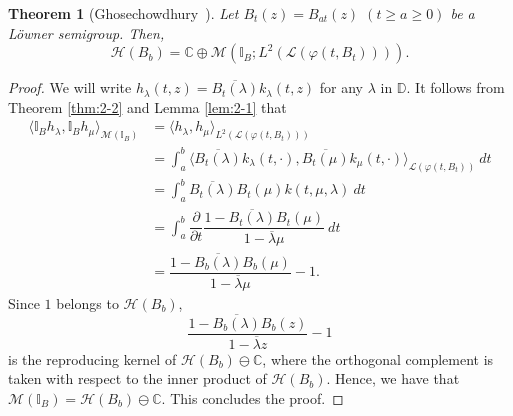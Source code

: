 \documentclass[12pt]{article}
\newtheorem{thm}{Theorem}[section]
\numberwithin{equation}{section}
\newcommand{\M}{{\mathcal M}}
\newcommand{\cL}{{\mathcal L}}
\newcommand{\C}{{\mathbb C}}
\newcommand{\D}{{\mathbb D}}
\newcommand{\bI}{{\mathbb I}}
\newcommand{\cH}{{\mathcal H}}
\newcommand{\la}{\langle}
\newcommand{\ra}{\rangle}
\newcommand{\p}{\partial}
\newcommand{\lam}{\lambda}
\begin{document}
\begin{thm}[Ghosechowdhury~\cite{G2}]\label{thm:5-2}
Let $B_t(z)=B_{at}(z)$ $(t\geq a\geq 0)$ be a L\"{o}wner semigroup. Then, 
\[
\cH(B_b)=\C \oplus \M(\bI_B; L^2(\cL(\varphi(t,B_t)))).
\]
\end{thm}

\begin{proof}
We will write $h_{\lam}(t,z)=\overline{B_t(\lam)}k_{\lam}(t,z)$ for any $\lam$ in $\D$. 
It follows from Theorem \ref{thm:2-2} and Lemma \ref{lem:2-1} that 
\begin{align*}
\la \bI_B h_{\lam}, \bI_B h_{\mu} \ra_{\M(\bI_B)}
&=\la  h_{\lam},  h_{\mu} \ra_{L^2(\cL(\varphi(t,B_{t})))}\\
&=\int_a^b \la \overline{B_t(\lam)}k_{\lam}(t,\cdot),\overline{B_t(\mu)}k_{\mu}(t,\cdot) \ra_{\cL(\varphi(t,B_{t}))}\ dt\\
&=\int_a^b \overline{B_t(\lam)}B_t(\mu)k(t,\mu,\lam)\ dt\\
&=\int_a^b \dfrac{\p}{\p t}\dfrac{1-\overline{B_t(\lam)}B_t(\mu)}{1-\overline{\lam}\mu}\ dt\\
&=\dfrac{1-\overline{B_b(\lam)}B_b(\mu)}{1-\overline{\lam}\mu}-1.
\end{align*}
Since $1$ belongs to $\cH(B_b)$, 
\[
\dfrac{1-\overline{B_b(\lam)}B_b(z)}{1-\overline{\lam}z}-1
\]
is the reproducing kernel of $\cH(B_b)\ominus \C$, where the orthogonal complement is taken with respect to the inner product of $\cH(B_b)$. 
Hence, we have that $\M(\bI_B)=\cH(B_b)\ominus \C$. 
This concludes the proof. 
\end{proof}
\end{document}
